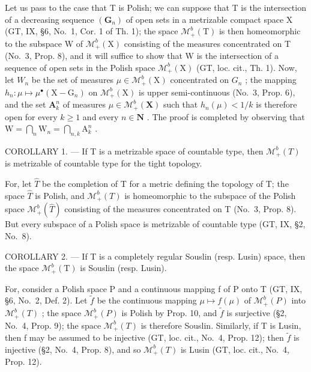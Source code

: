 Let us pass to the case that T is Polish; we can suppose that T is the intersection of a decreasing sequence \((\mathbf{G}_{n})\) of open sets in a metrizable compact space X (GT, IX, §6, No.~1, Cor. 1 of Th. 1); the space \(\mathcal{M}_{+}^{b}(\mathrm{T})\) is then homeomorphic to the subspace W of \(\mathcal{M}_{+}^{b}(\mathrm{X})\) consisting of the measures concentrated on T (No.~3, Prop. 8), and it will suffice to show that W is the intersection of a sequence of open sets in the Polish space \(\mathcal{M}_{+}^{b}(\mathrm{X})\) (GT, loc. cit., Th. 1). Now, let \(W_{n}\) be the set of measures \(\mu\in\mathcal{M}_{+}^{b}(\mathrm{X})\) concentrated on \(G_{n}\) ; the mapping \(h_{n}:\mu\mapsto\mu^{\bullet}(\mathrm{X}-\mathrm{G}_{n})\) on \(\mathcal{M}_{+}^{b}(\mathrm{X})\) is upper semi-continuous (No.~3, Prop. 6), and the set \(\mathbf{A}_k^n\) of measures \(\mu \in \mathcal{M}_+^b(\mathbf{X})\) such that \(h_n(\mu) < 1 / k\) is therefore open for every \(k \geqslant 1\) and every \(n \in \mathbf{N}\) . The proof is completed by observing that \(\mathrm{W} = \bigcap_{n} \mathrm{W}_n = \bigcap_{n,k} \mathrm{A}_k^n\) .

COROLLARY 1. --- If T is a metrizable space of countable type, then \(\mathcal{M}_{+}^{b}(T)\) is metrizable of countable type for the tight topology.

For, let \(\widehat{T}\) be the completion of T for a metric defining the topology of T; the space \(\widehat{T}\) is Polish, and \(\mathcal{M}_{+}^{b}(T)\) is homeomorphic to the subspace of the Polish space \(\mathcal{M}_{+}^{b}(\widehat{T})\) consisting of the measures concentrated on T (No.~3, Prop. 8). But every subspace of a Polish space is metrizable of countable type (GT, IX, §2, No.~8).

COROLLARY 2. --- If T is a completely regular Souslin (resp. Lusin) space, then the space \(\mathcal{M}_{+}^{b}(\mathrm{T})\) is Souslin (resp. Lusin).

For, consider a Polish space P and a continuous mapping f of P onto T (GT, IX, §6, No.~2, Def. 2). Let \(\widetilde{f}\) be the continuous mapping \(\mu\mapsto f(\mu)\) of \(\mathcal{M}_{+}^{b}(P)\) into \(\mathcal{M}_{+}^{b}(T)\) ; the space \(\mathcal{M}_{+}^{b}(P)\) is Polish by Prop. 10, and \(\widetilde{f}\) is surjective (§2, No.~4, Prop. 9); the space \(\mathcal{M}_{+}^{b}(T)\) is therefore Souslin. Similarly, if T is Lusin, then f may be assumed to be injective (GT, loc. cit., No.~4, Prop. 12); then \(\widetilde{f}\) is injective (§2, No.~4, Prop. 8), and so \(\mathcal{M}_{+}^{b}(T)\) is Lusin (GT, loc. cit., No.~4, Prop. 12).


